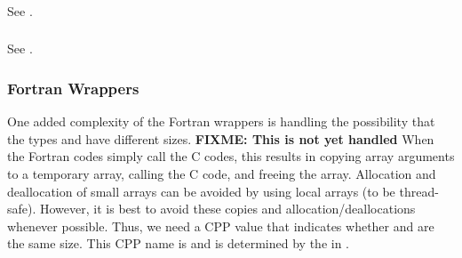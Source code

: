\documentclass{article}
\def\fixme#1{\marginpar{FIXME:}\textbf{FIXME: #1}}
\begin{document}

\subsubsection{}
See .

\subsubsection{}
See .

\subsubsection{Fortran Wrappers}
One added complexity of the Fortran wrappers is handling the possibility that
the types  and  have different sizes.
\fixme{This is not yet handled}
When the
Fortran codes simply call the C codes, this results in copying array arguments
to a temporary array, calling the C code, and freeing the array.  Allocation
and deallocation of small arrays can be avoided by using local arrays (to be
thread-safe).  However, it is best to avoid these copies and
allocation/deallocations whenever possible.  Thus, we
need a CPP value that indicates whether  and  are the
same size.  This CPP name is  and is
determined by the  in .

\end{document}
